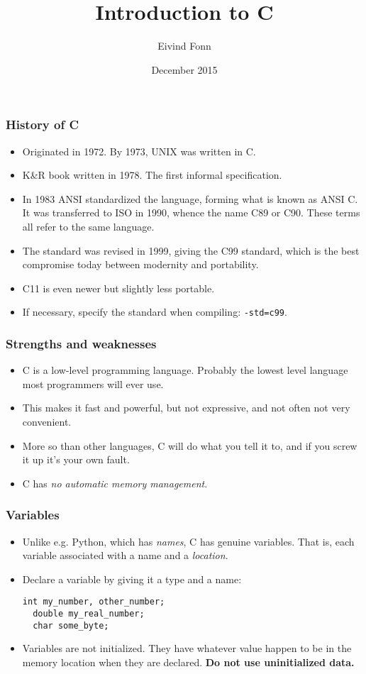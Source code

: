 

\title{Introduction to C}
\author{Eivind Fonn}
\date{December 2015}
\maketitle

\begin{frame}
  \frametitle{History of C}
  \begin{itemize}
  \item Originated in 1972. By 1973, UNIX was written in C.
  \item K\&R book written in 1978. The first informal specification.
  \item In 1983 ANSI standardized the language, forming what is known as ANSI C.
    It was transferred to ISO in 1990, whence the name C89 or C90. These terms
    all refer to the same language.
  \item The standard was revised in 1999, giving the C99 standard, which is the
    best compromise today between modernity and portability.
  \item C11 is even newer but slightly less portable.
  \item If necessary, specify the standard when compiling: \texttt{-std=c99}.
  \end{itemize}
\end{frame}

\begin{frame}
  \frametitle{Strengths and weaknesses}
  \begin{itemize}
  \item C is a low-level programming language. Probably the lowest level
    language most programmers will ever use.
  \item This makes it fast and powerful, but not expressive, and not often not
    very convenient.
  \item More so than other languages, C will do what you tell it to, and if you
    screw it up it's your own fault.
  \item C has \emph{no automatic memory management}.
  \end{itemize}
\end{frame}

\begin{frame}[fragile]
  \frametitle{Variables}
  \begin{itemize}
  \item Unlike e.g. Python, which has \emph{names}, C has genuine variables.
    That is, each variable associated with a name and a \emph{location}.
  \item Declare a variable by giving it a type and a name:
    \begin{lstlisting}[style=c]
  int my_number, other_number;
  double my_real_number;
  char some_byte;
    \end{lstlisting}
  \item Variables are not initialized. They have whatever value happen to be in
    the memory location when they are declared. \textbf{Do not use uninitialized
    data.}
  \end{itemize}
\end{frame}


